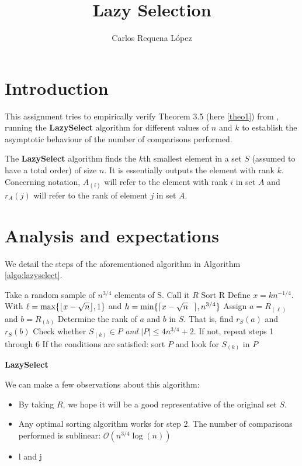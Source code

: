 \documentclass[12pt,a4paper]{article}
\title{Lazy Selection}
\author{Carlos Requena López}
\DeclarePairedDelimiter{\ceil}{\lceil}{\rceil}
\DeclarePairedDelimiter\floor{\lfloor}{\rfloor}
\begin{document}
\maketitle
\pagestyle{fancy}

\section{Introduction}

This assignment tries to empirically verify Theorem 3.5 (here
\ref{theo1}) from \cite[p.~49]{motwani}, running the
\textbf{LazySelect} algorithm for different values of $n$ and $k$ to
establish the asymptotic behaviour of the number of comparisons
performed.

The \textbf{LazySelect} algorithm finds the $k$th smallest element in
a set $S$ (assumed to have a total order) of size $n$. It is
essentially outputs the element with rank $k$. Concerning notation,
$A_{(i)}$ will refer to the element with rank $i$ in set $A$ and
$r_A(j)$ will refer to the rank of element $j$ in set $A$.
\section{Analysis and expectations}

We detail the steps of the aforementioned algorithm in Algorithm
\ref{algo:lazyselect}.

\begin{algorithm}[h]
  \SetAlgoLined

  \nl Take a random sample of $n^{3/4}$ elements of S. Call it $R$\;
  \nl Sort R\;
  \nl Define $x = kn^{-1/4}$. With $\ell = \text{max}\{\floor{x -
    \sqrt{n}}, 1\}$ and $h = \text{min}\{\ceil{x - \sqrt{n}\ \ }, n^{3/4}\}$\;
  \nl Assign $a = R_{(\ell)}$ and $b = R_{(h)}$\;
  \nl Determine the rank of $a$ and $b$ in $S$. That is, find $r_{S}(a)$
  and $r_{S}(b)$\;
  \nl {}
  \nl Check whether $S_{(k)} \in P$ \emph{and} $|P| \leq 4n^{3/4} +
  2$. If not, repeat steps 1 through 6\;
  \nl If the conditions are satisfied: sort $P$ and look for $S_{(k)}$
  in $P$\;
\caption{\bf LazySelect}
\label{algo:lazyselect}
\end{algorithm}

We can make a few observations about this algorithm:
\begin{itemize}
\item By taking $R$, we hope it will be a good representative of the
  original set $S$.
\item Any optimal sorting algorithm works for step 2. The number of
  comparisons performed is sublinear: $\mathcal{O}(n^{3/4}\log(n))$
\item l and j
\end{itemize}
\end{document}
